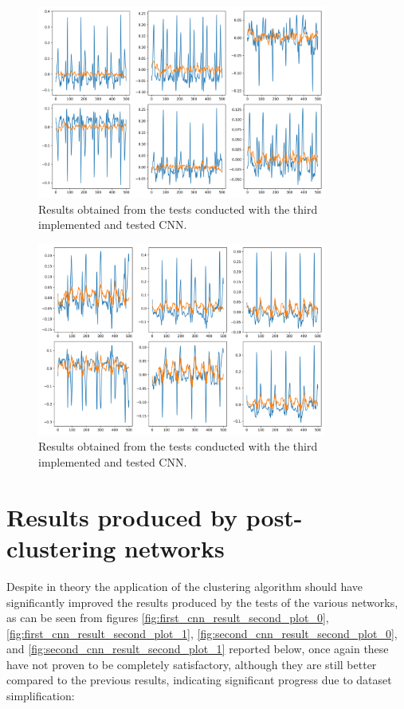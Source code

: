 \documentclass[12pt,english]{report}
\begin{document}
\begin{figure}[H]
    \centering
    \includegraphics[width=0.85\textwidth]{images/third_cnn_second_plot_0.png}
    \captionsetup{justification=centering}
    \caption{Results obtained from the tests conducted with the third implemented and tested CNN.}
    \label{fig:third_cnn_second_plot_0}
\end{figure}
\begin{figure}[H]
    \centering
    \includegraphics[width=0.85\textwidth]{images/third_cnn_second_plot_1.png}
    \captionsetup{justification=centering}
    \caption{Results obtained from the tests conducted with the third implemented and tested CNN.}
    \label{fig:third_cnn_second_plot_1}
\end{figure}

\section{Results produced by post-clustering networks}
\label{sec:clustering_risultati}

Despite in theory the application of the clustering algorithm should have significantly improved the results produced by the tests of the various networks, as can be seen from figures \ref{fig:first_cnn_result_second_plot_0}, \ref{fig:first_cnn_result_second_plot_1}, \ref{fig:second_cnn_result_second_plot_0}, and \ref{fig:second_cnn_result_second_plot_1} reported below, once again these have not proven to be completely satisfactory, although they are still better compared to the previous results, indicating significant progress due to dataset simplification:
\end{document}

